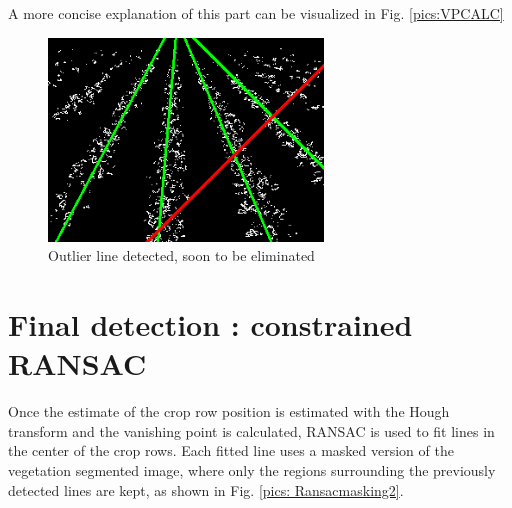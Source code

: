 A more concise explanation of this part can be visualized in Fig. \ref{pics:VPCALC}


\begin{figure}[H]
   \centering
   \includegraphics[width=0.65\textwidth]{Report/images/outlierdetected.png}
   \caption{Outlier line detected, soon to be eliminated}
   \label{pics:outlier}
\end{figure}





\section{Final detection : constrained RANSAC}
\label{sec:gliederung}

Once the estimate of the crop row position is estimated with the Hough transform and the vanishing point is calculated, RANSAC is used to fit lines in the center of the crop rows. Each fitted line uses a masked version of the vegetation segmented image, where only the regions surrounding the previously detected lines are kept, as shown in Fig. \ref{pics: Ransacmasking2}. \\

